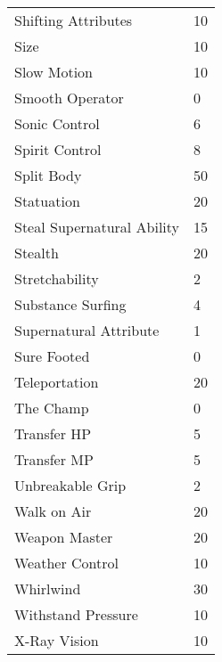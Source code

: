 \documentclass[twoside]{book}
\begin{document}
\begin{longtable}{p{1.25in}l}
      \raggedright  Shifting Attributes& 10\tabularnewline
      \raggedright  Size& 10\tabularnewline
      \raggedright  Slow Motion& 10\tabularnewline
      \raggedright  Smooth Operator& 0\tabularnewline
      \raggedright  Sonic Control& 6\tabularnewline
      \raggedright  Spirit Control& 8\tabularnewline
      \raggedright  Split Body& 50\tabularnewline
      \raggedright  Statuation& 20\tabularnewline
      \raggedright  Steal Supernatural Ability& 15\tabularnewline
      \raggedright  Stealth& 20\tabularnewline
      \raggedright  Stretchability& 2\tabularnewline
      \raggedright  Substance Surfing& 4\tabularnewline
      \raggedright  Supernatural Attribute& 1\tabularnewline
      \raggedright  Sure Footed& 0\tabularnewline
      \raggedright  Teleportation& 20\tabularnewline
      \raggedright  The Champ& 0\tabularnewline
      \raggedright  Transfer HP& 5\tabularnewline
      \raggedright  Transfer MP& 5\tabularnewline
      \raggedright  Unbreakable Grip& 2\tabularnewline
      \raggedright  Walk on Air& 20\tabularnewline
      \raggedright  Weapon Master& 20\tabularnewline
      \raggedright  Weather Control& 10\tabularnewline
      \raggedright  Whirlwind& 30\tabularnewline
      \raggedright  Withstand Pressure& 10\tabularnewline
      \raggedright  X-Ray Vision& 10\tabularnewline
      
\end{longtable}
    
\end{document}
